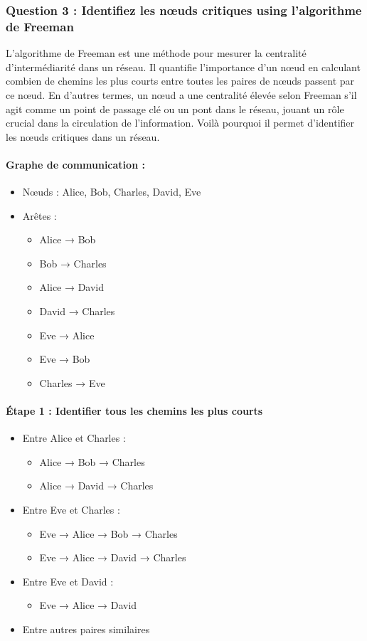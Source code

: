 \documentclass[12pt, a4paper]{article}
\begin{document}
	\subsubsection*{Question 3 : Identifiez les nœuds critiques using l'algorithme de Freeman}
	
	L'algorithme de Freeman est une méthode pour mesurer la centralité d'intermédiarité dans un réseau. Il quantifie l'importance d'un nœud en calculant combien de chemins les plus courts entre toutes les paires de nœuds passent par ce nœud. En d'autres termes, un nœud a une centralité élevée selon Freeman s'il agit comme un point de passage clé ou un pont dans le réseau, jouant un rôle crucial dans la circulation de l'information. Voilà pourquoi il permet d'identifier les nœuds critiques dans un réseau.
	
	\paragraph{Graphe de communication :}
	\begin{itemize}
		\item Nœuds : Alice, Bob, Charles, David, Eve
		\item Arêtes :
		\begin{itemize}
			\item Alice → Bob
			\item Bob → Charles
			\item Alice → David
			\item David → Charles
			\item Eve → Alice
			\item Eve → Bob
			\item Charles → Eve
		\end{itemize}
	\end{itemize}
	
	\paragraph{Étape 1 : Identifier tous les chemins les plus courts}
	\begin{itemize}
		\item Entre Alice et Charles :
		\begin{itemize}
			\item Alice → Bob → Charles
			\item Alice → David → Charles
		\end{itemize}
		\item Entre Eve et Charles :
		\begin{itemize}
			\item Eve → Alice → Bob → Charles
			\item Eve → Alice → David → Charles
		\end{itemize}
		\item Entre Eve et David :
		\begin{itemize}
			\item Eve → Alice → David
		\end{itemize}
		\item Entre autres paires similaires
		\end{itemize}
		
\end{document}
